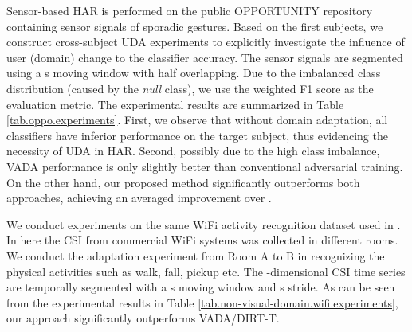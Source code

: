 Sensor-based HAR is performed on the public OPPORTUNITY repository containing sensor signals of sporadic gestures. Based on the first  subjects, we construct  cross-subject UDA experiments to explicitly investigate the influence of user (domain) change to the classifier accuracy. The sensor signals are segmented using a s moving window with half overlapping. Due to the imbalanced class distribution (caused by the \textit{null} class), we use the weighted F1 score as the evaluation metric. The experimental results are summarized in Table \ref{tab.oppo.experiments}. First, we observe that without domain adaptation, all classifiers have inferior performance on the target subject, thus evidencing the necessity of UDA in HAR. Second, possibly due to the high class imbalance, VADA performance is only slightly better than conventional adversarial training. On the other hand, our proposed method significantly outperforms both approaches, achieving an averaged improvement over .





\begin{table}[t]
\centering
{}
\caption{Ablation experiments for STL  CIFAR and OPPORTUNITY 1  2 tasks. Each row corresponds to adding the specified component(s) to the previous row.}
\label{tab.visual-domain.ablation.experiments}
\end{table}









We conduct experiments on the same WiFi activity recognition dataset \cite{yousefi2017survey} used in \cite{shu2018dirt}. In here the CSI from commercial WiFi systems was collected in  different rooms. We conduct the adaptation experiment from Room A to B in recognizing the  physical activities such as walk, fall, pickup etc. The -dimensional CSI time series are temporally segmented with a s moving window and s stride. As can be seen from the experimental results in Table \ref{tab.non-visual-domain.wifi.experiments}, our approach significantly outperforms VADA/DIRT-T.


